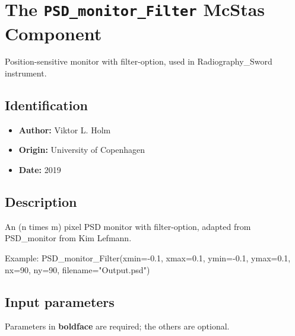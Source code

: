 \section{The \texttt{PSD\_monitor\_Filter} McStas Component}
Position-sensitive monitor with filter-option, used in Radiography\_Sword instrument.

\subsection*{Identification}
\begin{itemize}
  \item \textbf{Author:} Viktor L. Holm
  \item \textbf{Origin:} University of Copenhagen
  \item \textbf{Date:} 2019
\end{itemize}

\subsection*{Description}
An (n times m) pixel PSD monitor with filter-option, adapted from PSD\_monitor from Kim Lefmann.

Example: PSD\_monitor\_Filter(xmin=-0.1, xmax=0.1, ymin=-0.1, ymax=0.1, nx=90, ny=90, filename="Output.psd")

\subsection*{Input parameters}
Parameters in \textbf{boldface} are required; the others are optional.


